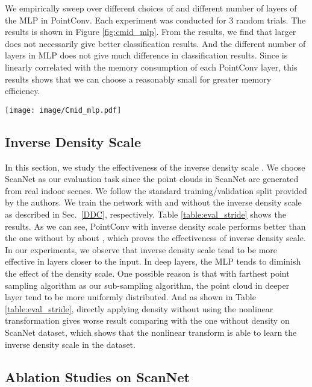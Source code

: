 \documentclass[10pt,twocolumn,letterpaper]{article}
\begin{document}
We empirically sweep over different choices of  and different number of layers of the MLP in PointConv. Each experiment was conducted for 3 random trials. The results is shown in Figure \ref{fig:cmid_mlp}. From the results, we find that larger  does not necessarily give better classification results. And the different number of layers in MLP does not give much difference in classification results. Since  is linearly correlated with the memory consumption of each PointConv layer, this results shows that we can choose a reasonably small  for greater memory efficiency.

\begin{figure*}
	\centering
	\texttt{[image: image/Cmid\_mlp.pdf]}
	\caption{Classification accuracy of different choice of  and layers number of MLP.}
	\label{fig:cmid_mlp}
\end{figure*}

\subsection{Inverse Density Scale}

In this section, we study the effectiveness of the inverse density scale . We choose ScanNet as our evaluation task since the point clouds in ScanNet are generated from real indoor scenes. We follow the standard training/validation split provided by the authors. We train the network with and without the inverse density scale as described in Sec.~\ref{DDC}, respectively. Table \ref{table:eval_stride} shows the results. As we can see, PointConv with inverse density scale performs better than the one without by about , which proves the effectiveness of inverse density scale. In our experiments, we observe that inverse density scale tend to be more effective in layers closer to the input. In deep layers, the MLP tends to diminish the effect of the density scale. One possible reason is that with farthest point sampling algorithm as our sub-sampling algorithm, the point cloud in deeper layer tend to be more uniformly distributed. And as shown in Table \ref{table:eval_stride}, directly applying density without using the nonlinear transformation gives worse result comparing with the one without density on ScanNet dataset, which shows that the nonlinear transform is able to learn the inverse density scale in the dataset. 

\subsection{Ablation Studies on ScanNet}
\end{document}
